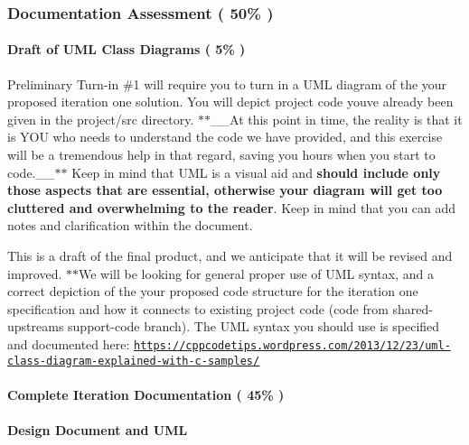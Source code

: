 \subsubsection*{Documentation Assessment ( 50\% )}

\paragraph*{Draft of U\+ML Class Diagrams ( 5\% )}

Preliminary Turn-\/in \#1 will require you to turn in a U\+ML diagram of the your proposed iteration one solution. You will depict project code you\textquotesingle{}ve already been given in the {\ttfamily project/src} directory. $\ast$$\ast$\+\_\+\+\_\+\+At this point in time, the reality is that it is Y\+OU who needs to understand the code we have provided, and this exercise will be a tremendous help in that regard, saving you hours when you start to code.\+\_\+\+\_\+$\ast$$\ast$ Keep in mind that U\+ML is a visual aid and {\bfseries should include only those aspects that are essential, otherwise your diagram will get too cluttered and overwhelming to the reader}. Keep in mind that you can add notes and clarification within the document.

This is a draft of the final product, and we anticipate that it will be revised and improved. $\ast$$\ast$\+We will be looking for general proper use of U\+ML syntax, and a correct depiction of the your proposed code structure for the iteration one specification and how it connects to existing project code (code from shared-\/upstream\textquotesingle{}s support-\/code branch). The U\+ML syntax you should use is specified and documented here\+: \href{https://cppcodetips.wordpress.com/2013/12/23/uml-class-diagram-explained-with-c-samples/}{\tt https\+://cppcodetips.\+wordpress.\+com/2013/12/23/uml-\/class-\/diagram-\/explained-\/with-\/c-\/samples/}

\paragraph*{Complete Iteration Documentation ( 45\% )}

\paragraph*{Design Document and U\+ML}

